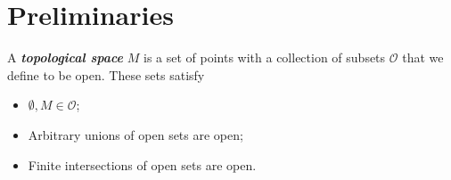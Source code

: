 \documentclass[UKenglish]{beamer}
\newcommand\boldgreen[1]{\textcolor{lighter_csu_green}{\emph{\textbf{#1}}}}
\newcommand{\opens}{\mathcal{O}}
\begin{document}
\section{Preliminaries}

\begin{frame}{}
\begin{figure}[H]
	\centering
	\def\svgwidth{0.75\columnwidth}
	
\end{figure}
\end{frame}

\begin{frame}{}
\begin{figure}[H]
	\centering
	\def\svgwidth{.75\columnwidth}
	
\end{figure}
\end{frame}

\begin{frame}{}
\begin{figure}[H]
	\centering
	\def\svgwidth{\columnwidth}
	
\end{figure}
\end{frame}

\begin{frame}{}
\begin{figure}[H]
	\centering
	\def\svgwidth{0.75\columnwidth}
	
\end{figure}
\end{frame}

\begin{frame}{}
\begin{figure}[H]
	\centering
	\def\svgwidth{0.75\columnwidth}
	
\end{figure}
\end{frame}

\begin{frame}{}
	\vfill
	A \boldgreen{topological space} $M$ is a set of points with a collection of subsets $\opens$ that we define to be open. These sets satisfy \pause
	\begin{itemize}
		\item $\emptyset,M \in \opens$;
		\pause
		\item Arbitrary unions of open sets are open;
		\pause
		\item Finite intersections of open sets are open.
	\end{itemize}
	\vfill
\end{frame}
\end{document}
